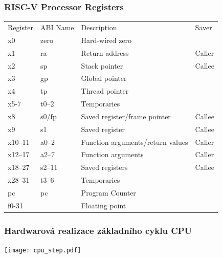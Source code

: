 \documentclass{beamer}
\begin{document}
\begin{frame}
\frametitle{RISC-V Processor Registers}
\begin{tabular}{l l l l}
Register & ABI Name & Description & Saver \\
x0 & zero & Hard-wired zero &  \\
x1 & ra & Return address & Caller \\
x2 & sp & Stack pointer &  Callee\\
x3 & gp & Global pointer &  \\
x4 & tp & Thread pointer &  \\
x5-7 & t0--2 & Temporaries &  \\
x8 & s0/fp & Saved register/frame pointer & Callee \\
x9 & s1 & Saved register &  Callee \\
x10--11 & a0--2 & Function arguments/return values &  Caller \\
x12--17 & a2--7 & Function arguments & Caller \\
x18--27 & s2--11 & Saved registers & Callee \\
x28--31 & t3--6 & Temporaries &  \\
pc & pc & Program Counter &  \\
f0-31 &  & Floating point &  \\
\end{tabular}
\end{frame}



\begin{frame}
\frametitle{Hardwarová realizace základního cyklu CPU}

\begin{center}
\texttt{[image: cpu\_step.pdf]}
\end{center}

\end{frame}
\end{document}
